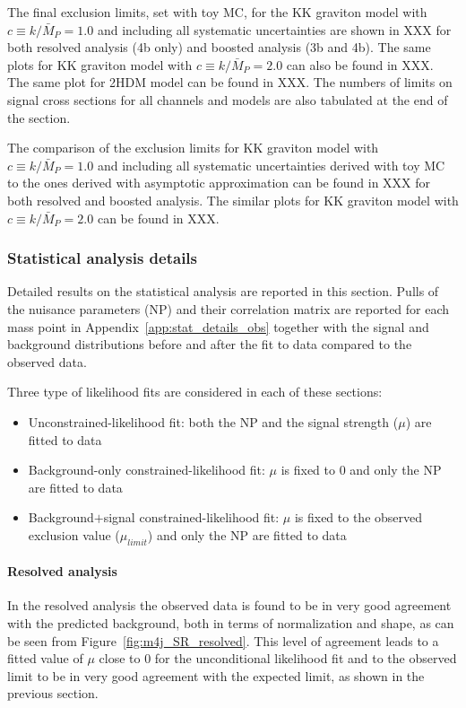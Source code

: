 The final exclusion limits, set with toy MC, for the KK graviton model with  $c \equiv k/\bar{M}_P = 1.0$
and including all systematic uncertainties are shown in XXX for both resolved analysis (4b only) and boosted analysis (3b and 4b). The same plots for KK graviton model with $c \equiv k/\bar{M}_P = 2.0$ can also be found in XXX. The same plot for 2HDM model can be found in XXX. The numbers of limits on signal cross sections for all channels and models are also tabulated at the end of the section.

The comparison of the exclusion limits for KK graviton model with $c \equiv k/\bar{M}_P = 1.0$
and including all systematic uncertainties derived with toy MC to the ones derived with asymptotic approximation can be found in XXX for both resolved and boosted analysis. The similar plots for KK graviton model with $c \equiv k/\bar{M}_P = 2.0$ can be found in XXX.

\clearpage


\subsubsection{Statistical analysis details}

Detailed results on the statistical analysis are reported in this section.
Pulls of the nuisance parameters (NP) and their correlation matrix are reported for each mass point
in Appendix~\ref{app:stat_details_obs} together with the signal and background distributions before and
after the fit to data compared to the observed data.

Three type of likelihood fits are considered in each of these sections:
\begin{itemize}
\item Unconstrained-likelihood fit: both the NP and the signal strength ($\mu$)
are fitted to data
\item Background-only constrained-likelihood fit: $\mu$ is fixed to 0 and only the NP are fitted to data
\item Background$+$signal constrained-likelihood fit: $\mu$ is fixed to the observed exclusion value ($\mu_{limit}$) and only the NP are fitted to data
\end{itemize}

\paragraph{Resolved analysis}

In the resolved analysis the observed data is found to be in very good agreement with the predicted background,
both in terms of normalization and shape, as can be seen from Figure~\ref{fig:m4j_SR_resolved}.
This level of agreement leads to a fitted value of $\mu$ close to 0 for the unconditional likelihood fit
and to the observed limit to be in very good agreement with the expected limit, as shown in the previous
section.

